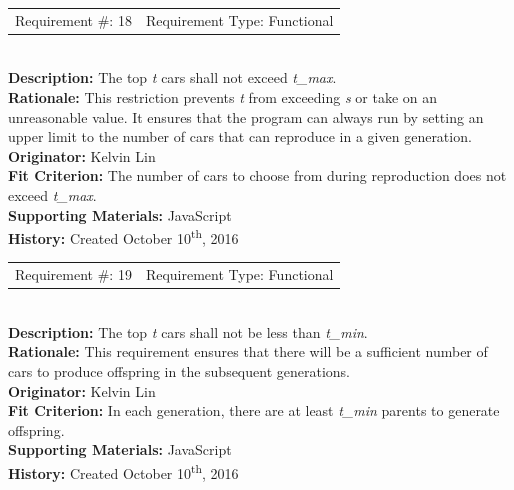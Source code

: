 \documentclass[12pt, titlepage]{article}
\begin{document}
\begin{reqbox}
%
\begin{tabular}{cc}
Requirement \#: 18 & Requirement Type: Functional \\
\end{tabular} \\
%
\textbf{Description:} The top \textit{t} cars shall not exceed \textit{t\_max}. 
\\
\textbf{Rationale:} This restriction prevents \textit{t} from exceeding 
\textit{s} or take on an unreasonable value. It ensures that the program can 
always run by setting an upper limit to the number of cars that can reproduce in 
a given generation. \\
\textbf{Originator:} Kelvin Lin\\
\textbf{Fit Criterion:} The number of cars to choose from during reproduction 
does not exceed \textit{t\_max}.\\
%  
\textbf{Supporting Materials:} JavaScript \\
\textbf{History:} Created October 10\textsuperscript{th}, 2016
%
\end{reqbox}

\begin{reqbox}
%
\begin{tabular}{cc}
Requirement \#: 19 & Requirement Type: Functional \\
\end{tabular} \\
%
\textbf{Description:} The top \textit{t} cars shall not be less than 
\textit{t\_min}. \\
\textbf{Rationale:} This requirement ensures that there will be a sufficient 
number of cars to produce offspring in the subsequent generations. \\
\textbf{Originator:} Kelvin Lin\\
\textbf{Fit Criterion:} In each generation, there are at least \textit{t\_min} 
parents to generate offspring.\\
%  
\textbf{Supporting Materials:} JavaScript \\
\textbf{History:} Created October 10\textsuperscript{th}, 2016
%
\end{reqbox}
\end{document}
